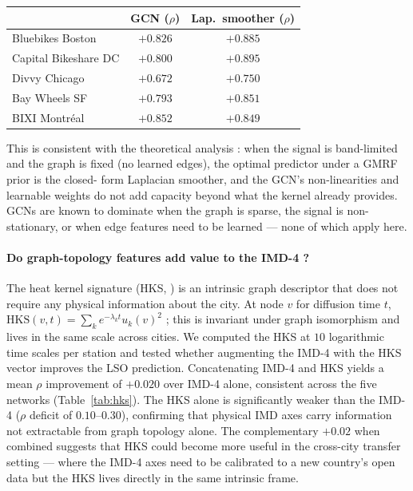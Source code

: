 \begin{center}
\small
\begin{tabular}{@{}lcc@{}}
\toprule
                       & GCN ($\rho$) & Lap.\ smoother ($\rho$) \\
\midrule
Bluebikes Boston       & $+0.826$ & $\mathbf{+0.885}$ \\
Capital Bikeshare DC    & $+0.800$ & $\mathbf{+0.895}$ \\
Divvy Chicago          & $+0.672$ & $\mathbf{+0.750}$ \\
Bay Wheels SF          & $+0.793$ & $\mathbf{+0.851}$ \\
BIXI Montr\'eal         & $\mathbf{+0.852}$ & $+0.849$ \\
\bottomrule
\end{tabular}
\end{center}

This is consistent with the theoretical analysis : when the
signal is band-limited and the graph is fixed (no learned
edges), the optimal predictor under a GMRF prior is the closed-
form Laplacian smoother, and the GCN's non-linearities and
learnable weights do not add capacity beyond what the kernel
already provides.  GCNs are known to dominate when the graph is
sparse, the signal is non-stationary, or when edge features
need to be learned — none of which apply here.

\paragraph{Do graph-topology features add value to the IMD-4 ?}
The heat kernel signature (HKS, \citealp{Sun2009}) is an
intrinsic graph descriptor that does not require any physical
information about the city.  At node $v$ for diffusion time $t$,
$\mathrm{HKS}(v, t) = \sum_k e^{-\lambda_k t} u_k(v)^2$ ; this is
invariant under graph isomorphism and lives in the same scale
across cities.  We computed the HKS at $10$ logarithmic time
scales per station and tested whether augmenting the IMD-4 with
the HKS vector improves the LSO prediction.  Concatenating IMD-4
and HKS yields a mean $\rho$ improvement of $+0.020$ over IMD-4
alone, consistent across the five networks (Table~\ref{tab:hks}).
The HKS alone is significantly weaker than the IMD-4 ($\rho$
deficit of $0.10$--$0.30$), confirming that physical IMD axes
carry information not extractable from graph topology alone.
The complementary $+0.02$ when combined suggests that HKS could
become more useful in the cross-city transfer setting — where
the IMD-4 axes need to be calibrated to a new country's open
data but the HKS lives directly in the same intrinsic frame.

